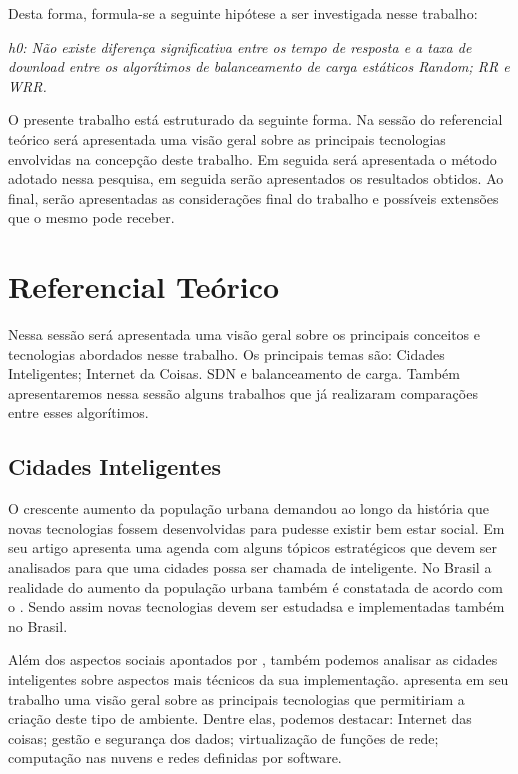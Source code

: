 \documentclass[12pt]{article}
\begin{document}
Desta forma, formula-se a seguinte hipótese a ser investigada nesse trabalho:

\textit{h0: Não existe diferença significativa entre os tempo de resposta e a taxa de download entre os algorítimos de balanceamento de carga estáticos Random; RR e WRR.}

O presente trabalho está estruturado da seguinte forma. Na sessão do referencial teórico será apresentada uma visão geral sobre as principais tecnologias envolvidas na concepção deste trabalho. Em seguida será apresentada o método adotado nessa pesquisa, em seguida serão apresentados os resultados obtidos. Ao final, serão apresentadas as considerações final do trabalho e possíveis extensões que o mesmo pode receber.

\section{Referencial Teórico}

Nessa sessão será apresentada uma visão geral sobre os principais conceitos e tecnologias abordados nesse trabalho. Os principais temas são: Cidades Inteligentes; Internet da Coisas. SDN e balanceamento de carga. Também apresentaremos nessa sessão alguns trabalhos que já realizaram comparações entre esses algorítimos. 

\subsection{Cidades Inteligentes}

O crescente aumento da população urbana demandou ao longo da história que novas tecnologias fossem desenvolvidas para pudesse existir bem estar social. Em seu artigo \cite{Caragliu2011} apresenta uma agenda com alguns tópicos estratégicos que devem ser analisados para que uma cidades possa ser chamada de inteligente. No Brasil a realidade do aumento da população urbana também é constatada de acordo com o \cite{IBGE2011}. Sendo assim novas tecnologias devem ser estudadsa e implementadas também no Brasil.

Além dos aspectos sociais apontados por \cite{Caragliu2011}, também podemos analisar as cidades inteligentes sobre aspectos mais técnicos da sua implementação. \cite{Gharaibeh2017} apresenta em seu trabalho uma visão geral sobre as principais tecnologias que permitiriam a criação deste tipo de ambiente. Dentre elas, podemos destacar: Internet das coisas; gestão e segurança dos dados; virtualização de funções de rede; computação nas nuvens e redes definidas por software. 
\end{document}
